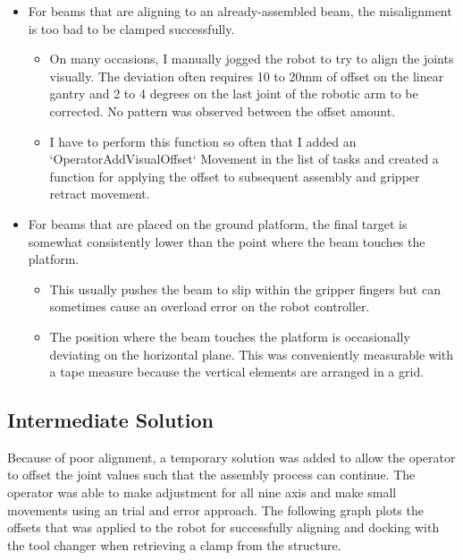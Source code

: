 \documentclass[11pt]{book}
\begin{document}
\begin{itemize}
	\item For beams that are aligning to an already-assembled beam, the misalignment is too bad to be clamped successfully. 

\begin{itemize}
	\item On many occasions, I manually jogged the robot to try to align the joints visually. The deviation often requires 10 to 20mm of offset on the linear gantry and 2 to 4 degrees on the last joint of the robotic arm to be corrected. No pattern was observed between the offset amount.

	\item I have to perform this function so often that I added an `OperatorAddVisualOffset` Movement in the list of tasks and created a function for applying the offset to subsequent assembly and gripper retract movement. 

\end{itemize}
	\item For beams that are placed on the ground platform, the final target is somewhat consistently lower than the point where the beam touches the platform. 

\begin{itemize}
	\item This usually pushes the beam to slip within the gripper fingers but can sometimes cause an overload error on the robot controller.

	\item The position where the beam touches the platform is occasionally deviating on the horizontal plane. This was conveniently measurable with a tape measure because the vertical elements are arranged in a grid.

\end{itemize}
\end{itemize}
\subsection{Intermediate Solution}

Because of poor alignment, a temporary solution was added to allow the operator to offset the joint values such that the assembly process can continue. The operator was able to make adjustment for all nine axis and make small movements using an trial and error approach. The following graph plots the offsets that was applied to the robot for successfully aligning and docking with the tool changer when retrieving a clamp from the structure.
\end{document}
